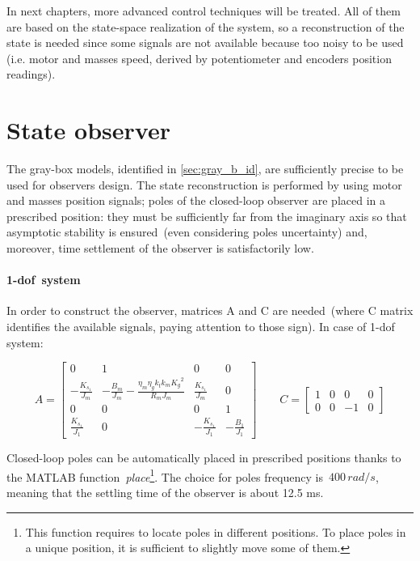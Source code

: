 
In next chapters, more advanced control techniques will be treated. All of them are based on the state-space realization of the system, so a reconstruction of the state is needed since some signals are not available because too noisy to be used (i.e. motor and masses speed, derived by potentiometer and encoders position readings).

\section{State observer}

The gray-box models, identified in \cref{sec:gray_b_id}, are sufficiently precise to be used for observers design. The state reconstruction is performed by using motor and masses position signals; poles of the closed-loop observer are placed in a prescribed position: they must be sufficiently far from the imaginary axis so that asymptotic stability is ensured~(even considering poles uncertainty) and, moreover, time settlement of the observer is satisfactorily low.

\paragraph{\acrshort{1-dof}\ system}

In order to construct the observer, matrices A and C are needed~(where C matrix identifies the available signals, paying attention to those sign). In case of \acrshort{1-dof} system:

\begin{equation}
	A = 
	\begin{bmatrix}
		0 &1 & 0 & 0 \\
		-\frac{K_{s_1}}{J_m} & -\frac{B_m}{J_m}-\frac{\eta_m \eta_g k_t k_m {K_g}^2}{R_m J_m}  & \frac{K_{s_1}}{J_m} & 0 \\
		0 & 0 & 0 & 1 \\
		\frac{K_{s_1}}{J_1} & 0 & -\frac{K_{s_1}}{J_1} & -\frac{B_1}{J_1}
	\end{bmatrix}
	\qquad
	C =
	\begin{bmatrix}
		1 & 0 & 0 & 0 \\
		0 & 0 & -1 & 0
	\end{bmatrix}
\label{eqn:1dof_mat_obs}
\end{equation}

Closed-loop poles can be automatically placed in prescribed positions thanks to the MATLAB function~\textit{place}\footnote{This function requires to locate poles in different positions. To place poles in a unique position, it is sufficient to slightly move some of them.}.
The choice for poles frequency is~$400 \, rad/s$, meaning that the settling time of the observer is about 12.5 ms.

